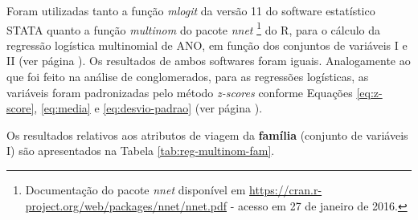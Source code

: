 Foram utilizadas tanto a função \textit{mlogit} da versão 11 do software estatístico STATA quanto a função \textit{multinom} do pacote \textit{nnet}%
\footnote{Documentação do pacote \textit{nnet} disponível em \url{https://cran.r-project.org/web/packages/nnet/nnet.pdf} - acesso em 27 de janeiro de 2016.} do R, 
para o cálculo da regressão logística multinomial de ANO, em função dos conjuntos de variáveis I e II (ver página \pageref{conjuntos-variaveis}).
Os resultados de ambos softwares foram iguais.
Analogamente ao que foi feito na análise de conglomerados, para as regressões logísticas, as variáveis foram padronizadas pelo método \textit{z-scores} conforme Equações \eqref{eq:z-score}, \eqref{eq:media} e \eqref{eq:desvio-padrao} (ver página \pageref{eq:z-score}).

Os resultados relativos aos atributos de viagem da \textbf{família} (conjunto de variáveis I) são apresentados na Tabela \ref{tab:reg-multinom-fam}.
 
